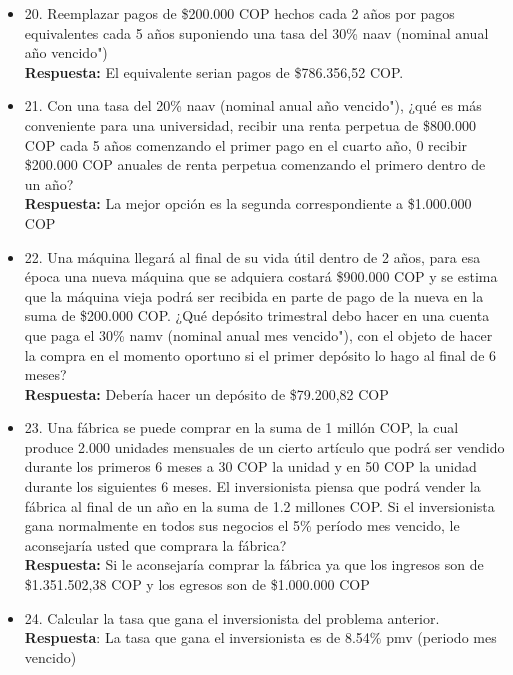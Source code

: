 \begin{itemize}
 \item 20. Reemplazar pagos de \$200.000 COP hechos cada 2 años por pagos equivalentes cada 5 años suponiendo una tasa del 30\% naav (nominal anual año vencido")\\
       \textbf{Respuesta:} El equivalente serian pagos de \$786.356,52 COP.\\
       \medskip

 \item 21. Con una tasa del 20\% naav (nominal anual año vencido"), ¿qué es más conveniente para una universidad, recibir una renta perpetua de \$800.000 COP cada 5 años comenzando el primer pago en el cuarto año, 0 recibir \$200.000 COP anuales de renta perpetua comenzando el primero dentro de un año?\\
       \textbf{Respuesta:} La mejor opción es la segunda correspondiente a \$1.000.000 COP\\
       \medskip

 \item 22. Una máquina llegará al final de su vida útil dentro de 2 años, para esa época una nueva máquina que se adquiera costará \$900.000 COP y se estima que la máquina vieja podrá ser recibida en parte de pago de la nueva en la suma de \$200.000 COP. ¿Qué depósito trimestral debo hacer en una cuenta que paga el 30\% namv (nominal anual mes vencido"), con el objeto de hacer la compra en el momento oportuno si el primer depósito lo hago al final de 6 meses?\\
       \textbf{Respuesta:} Debería hacer un depósito de \$79.200,82 COP\\
       \medskip

 \item 23. Una fábrica se puede comprar en la suma de 1 millón COP, la cual produce 2.000 unidades mensuales de un cierto artículo que podrá ser vendido durante los primeros 6 meses a 30 COP la unidad y en 50 COP la unidad durante los siguientes 6 meses. El inversionista piensa que podrá vender la fábrica al final de un año en la suma de 1.2 millones COP. Si el inversionista gana normalmente en todos sus negocios el 5\% período mes vencido, le aconsejaría usted que comprara la fábrica?\\
       \textbf{Respuesta:} Si le aconsejaría comprar la fábrica ya que los ingresos son de \$1.351.502,38 COP y los egresos son de \$1.000.000 COP\\
       \medskip

 \item 24. Calcular la tasa que gana el inversionista del problema anterior.\\
       \textbf{Respuesta}: La tasa que gana el inversionista es de 8.54\% pmv (periodo mes vencido)\\
       \medskip


\end{itemize}
